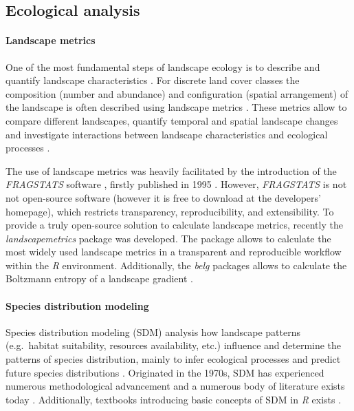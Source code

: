 \documentclass[smallextended]{svjour3}       %
\begin{document}
\hypertarget{sec:ecological_analysis}{%
\subsection{Ecological analysis}\label{sec:ecological_analysis}}

\hypertarget{sec:landscape_metrics}{%
\paragraph{Landscape metrics}\label{sec:landscape_metrics}}

One of the most fundamental steps of landscape ecology is to describe
and quantify landscape characteristics \cite{Turner2005,Lausch2015}. For
discrete land cover classes the composition (number and abundance) and
configuration (spatial arrangement) of the landscape is often described
using landscape metrics
\cite{Gustafson1998,Uuemaa2009,Uuemaa2013,Gustafson2019}. These metrics
allow to compare different landscapes, quantify temporal and spatial
landscape changes and investigate interactions between landscape
characteristics and ecological processes \cite{Uuemaa2009}.

The use of landscape metrics was heavily facilitated by the introduction
of the \emph{FRAGSTATS} software \cite{McGarigal2012}, firstly published
in 1995 \cite{Kupfer2012,Gustafson2019}. However, \emph{FRAGSTATS} is
not not open-source software (however it is free to download at the
developers' homepage), which restricts transparency, reproducibility,
and extensibility. To provide a truly open-source solution to calculate
landscape metrics, recently the \emph{landscapemetrics} package
\cite{Hesselbarth2019a} was developed. The package allows to calculate
the most widely used landscape metrics in a transparent and reproducible
workflow within the \emph{R} environment. Additionally, the \emph{belg}
packages allows to calculate the Boltzmann entropy of a landscape
gradient \cite{Nowosad2019a}.

\hypertarget{sec:SDM}{%
\paragraph{Species distribution modeling}\label{sec:SDM}}

Species distribution modeling (SDM) analysis how landscape patterns
(e.g.~habitat suitability, resources availability, etc.) influence and
determine the patterns of species distribution, mainly to infer
ecological processes and predict future species distributions
\cite{Wiersma2011}. Originated in the 1970s, SDM has experienced
numerous methodological advancement and a numerous body of literature
exists today \cite{Zimmermann2010}. Additionally, textbooks introducing
basic concepts of SDM in \emph{R} exists \cite{Guisan2017,Fletcher2019}.
\end{document}
